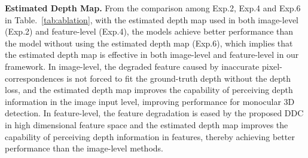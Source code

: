 \documentclass[10pt,twocolumn,letterpaper]{article}
\begin{document}
\begin{table}[t!]
    \small
    \centering
    \vspace{-3mm}
  \caption{Performance for \emph{Car} on KITTI \emph{val} set at IOU threshold 0.7. The best results are \textbf{bold}, the second best \underline{underlined}.}
    \label{tab:kitti_val}
    \vspace{-4mm}
\end{table}


\noindent\textbf{Estimated Depth Map.} From the comparison among Exp.2, Exp.4 and Exp.6 in Table.~\ref{tab:ablation}, with the estimated depth map used in both image-level (Exp.2) and feature-level (Exp.4), the models achieve better performance than the model without using the estimated depth map (Exp.6), which implies that the estimated depth map is effective in both image-level and feature-level in our framework. In image-level, the degraded feature caused by inaccurate pixel-correspondences is not forced to fit the ground-truth depth without the depth loss, and the estimated depth map improves the capability of perceiving depth information in the image input level, improving performance for monocular 3D detection. In feature-level, the feature degradation is eased by the proposed DDC in high dimensional feature space and the estimated depth map improves the capability of perceiving depth information in features, thereby achieving better performance than the image-level methods.
\end{document}
